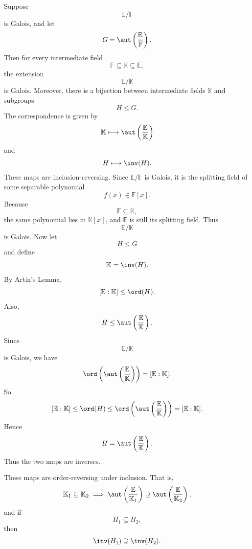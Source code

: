 \begin{theorem}{
    Suppose
    \[
        \mathbb{E}/\mathbb{F}
    \]
    is Galois, and let
    \[
        G=\aut\left(\frac{\mathbb{E}}{\mathbb{F}}\right).
    \]
    Then for every intermediate field
    \[
        \mathbb{F}\subseteq \mathbb{K}\subseteq \mathbb{E},
    \]
    the extension
    \[
        \mathbb{E}/\mathbb{K}
    \]
    is Galois.
    Moreover, there is a bijection between intermediate fields $\mathbb{K}$ and subgroups
    \[
        H\leq G.
    \]
    The correspondence is given by
    \[
        \mathbb{K}\longmapsto \aut\left(\frac{\mathbb{E}}{\mathbb{K}}\right)
    \]
    and
    \[
        H\longmapsto \inv(H).
    \]
    These maps are inclusion-reversing.
}
    Since $\mathbb{E}/\mathbb{F}$ is Galois, it is the splitting field of some separable polynomial
    \[
        f(x)\in \mathbb{F}[x].
    \]
    Because
    \[
        \mathbb{F}\subseteq \mathbb{K},
    \]
    the same polynomial lies in $\mathbb{K}[x]$, and $\mathbb{E}$ is still its splitting field.
    Thus
    \[
        \mathbb{E}/\mathbb{K}
    \]
    is Galois.
    Now let
    \[
        H\leq G
    \]
    and define
    \[
        \mathbb{K}=\inv(H).
    \]
    By Artin's Lemma,
    \[
        [\mathbb{E}:\mathbb{K}]\leq \ord(H).
    \]
    Also,
    \[
        H\leq \aut\left(\frac{\mathbb{E}}{\mathbb{K}}\right).
    \]
    Since
    \[
        \mathbb{E}/\mathbb{K}
    \]
    is Galois, we have
    \[
        \ord\left(\aut\left(\frac{\mathbb{E}}{\mathbb{K}}\right)\right)
        =
        [\mathbb{E}:\mathbb{K}].
    \]
    So
    \[
        [\mathbb{E}:\mathbb{K}]
        \leq
        \ord(H)
        \leq
        \ord\left(\aut\left(\frac{\mathbb{E}}{\mathbb{K}}\right)\right)
        =
        [\mathbb{E}:\mathbb{K}].
    \]
    Hence
    \[
        H=\aut\left(\frac{\mathbb{E}}{\mathbb{K}}\right).
    \]
    Thus the two maps are inverses.
\end{theorem}

These maps are order-reversing under inclusion.
That is,
\[
    \mathbb{K}_1\subseteq \mathbb{K}_2
    \implies
    \aut\left(\frac{\mathbb{E}}{\mathbb{K}_1}\right)\supseteq
    \aut\left(\frac{\mathbb{E}}{\mathbb{K}_2}\right),
\]
and if
\[
    H_1\subseteq H_2,
\]
then
\[
    \inv(H_1)\supseteq \inv(H_2).
\]

